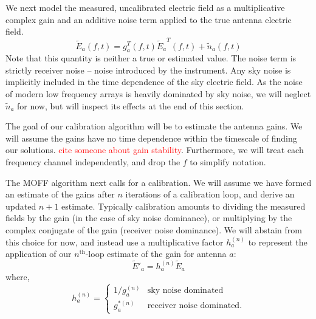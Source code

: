 \documentclass[a4paper,fleqn,usenatbib]{../mnras}
\newcommand{\Er}[1]{\ensuremath{\widetilde{E}_{#1}}}
\newcommand{\Erest}[1]{\ensuremath{\widetilde{E}'_{#1}}}
\begin{document}
We next model the measured, uncalibrated electric field as a multiplicative complex gain and an additive noise term applied to the true antenna electric field. 
\begin{equation}\label{eq:apply_gain}
\Er{a}(f,t) = g^T_a(f,t) \Er{a}^T(f,t) + \widetilde{n}_a(f,t)
\end{equation}
Note that this quantity is neither a true or estimated value. The noise term is strictly receiver noise -- noise introduced by the instrument. Any sky noise is implicitly included in the time dependence of the sky electric field. As the noise of modern low frequency arrays is heavily dominated by sky noise, we will neglect $\widetilde{n}_a$ for now, but will inspect its effects at the end of this section.

The goal of our calibration algorithm will be to estimate the antenna gains. We will assume the gains have no time dependence within the timescale of finding our solutions. \textcolor{red}{cite someone about gain stability}. Furthermore, we will treat each frequency channel independently, and drop the $f$ to simplify notation.

The MOFF algorithm next calls for a calibration. We will assume we have formed an estimate of the gains after $n$ iterations of a calibration loop, and derive an updated $n+1$ estimate. Typically calibration amounts to dividing the measured fields by the gain (in the case of sky noise dominance), or multiplying by the complex conjugate of the gain (receiver noise dominance). We will abstain from this choice for now, and instead use a multiplicative factor $h^{(n)}_a$ to represent the application of our $n^{\mathrm{th}}$-loop estimate of the gain for antenna $a$:
\begin{equation}
\Erest{a} = h^{(n)}_a \Er{a}
\end{equation}
where,
\begin{equation}
h^{(n)}_a=\begin{cases}
1/g^{(n)}_a & \mbox{sky noise dominated} \\ 
g^{*(n)}_a & \mbox{receiver noise dominated}.
\end{cases}
\end{equation}
\end{document}
